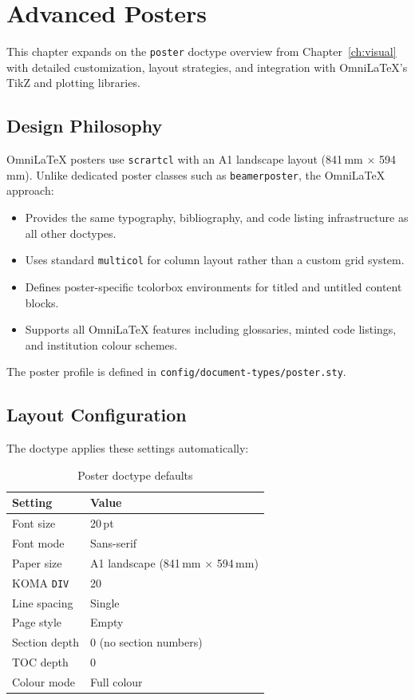 \chapter{Advanced Posters}
\label{ch:posters}

This chapter expands on the \texttt{poster} doctype overview from
Chapter~\ref{ch:visual} with detailed customization, layout strategies,
and integration with OmniLaTeX's TikZ and plotting libraries.

\section{Design Philosophy}

OmniLaTeX posters use \texttt{scrartcl} with an A1 landscape layout
(841\,mm $\times$ 594\,mm).  Unlike dedicated poster classes such as
\texttt{beamerposter}, the OmniLaTeX approach:

\begin{itemize}
    \item Provides the same typography, bibliography, and code listing
          infrastructure as all other doctypes.
    \item Uses standard \texttt{multicol} for column layout rather than
          a custom grid system.
    \item Defines poster-specific tcolorbox environments for titled and
          untitled content blocks.
    \item Supports all OmniLaTeX features including glossaries, minted
          code listings, and institution colour schemes.
\end{itemize}

The poster profile is defined in
\texttt{config/document-types/poster.sty}.

\section{Layout Configuration}

The doctype applies these settings automatically:

\begin{table}[htbp]
    \centering
    \caption{Poster doctype defaults}
    \label{tab:poster-defaults}
    \begin{tabular}{@{} l l @{}}
        \toprule
        \textbf{Setting} & \textbf{Value} \\
        \midrule
        Font size      & 20\,pt \\
        Font mode      & Sans-serif \\
        Paper size     & A1 landscape (841\,mm $\times$ 594\,mm) \\
        KOMA \texttt{DIV} & 20 \\
        Line spacing   & Single \\
        Page style     & Empty \\
        Section depth  & 0 (no section numbers) \\
        TOC depth      & 0 \\
        Colour mode    & Full colour \\
        \bottomrule
    \end{tabular}
\end{table}


